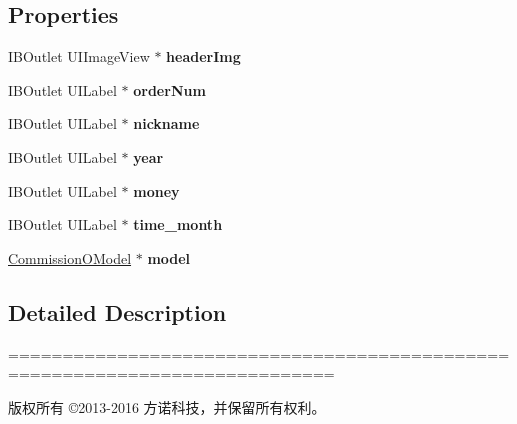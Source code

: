 \subsection*{Properties}
\begin{DoxyCompactItemize}
\item 
\mbox{\label{interface_t_x_my_commision_cell_a40f6b4058bf1004d8d5df27b5e6e2d80}} 
I\+B\+Outlet U\+I\+Image\+View $\ast$ {\bfseries header\+Img}
\item 
\mbox{\label{interface_t_x_my_commision_cell_af0c3f02d52a5745f294739491c68fed6}} 
I\+B\+Outlet U\+I\+Label $\ast$ {\bfseries order\+Num}
\item 
\mbox{\label{interface_t_x_my_commision_cell_a89d45a8c7d71ac6529c06c53625c57ec}} 
I\+B\+Outlet U\+I\+Label $\ast$ {\bfseries nickname}
\item 
\mbox{\label{interface_t_x_my_commision_cell_a710a118671f0786d9e17eb4b73e22379}} 
I\+B\+Outlet U\+I\+Label $\ast$ {\bfseries year}
\item 
\mbox{\label{interface_t_x_my_commision_cell_a61ba52e11725c317f275de9644a3b90d}} 
I\+B\+Outlet U\+I\+Label $\ast$ {\bfseries money}
\item 
\mbox{\label{interface_t_x_my_commision_cell_a54928674bfe399abd55e0631c2331dab}} 
I\+B\+Outlet U\+I\+Label $\ast$ {\bfseries time\+\_\+month}
\item 
\mbox{\label{interface_t_x_my_commision_cell_a3b14aa7b0f0d7dec786e6cd1899295e3}} 
\mbox{\hyperlink{interface_commission_o_model}{Commission\+O\+Model}} $\ast$ {\bfseries model}
\end{DoxyCompactItemize}


\subsection{Detailed Description}
============================================================================

版权所有 ©2013-\/2016 方诺科技，并保留所有权利。

